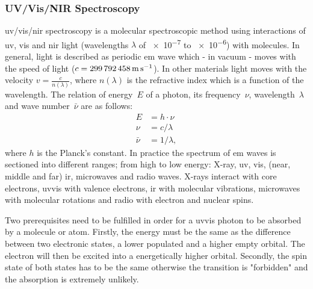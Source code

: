 \subsubsection{UV/Vis/NIR Spectroscopy}
\Gls{uv}/\gls{vis}/\gls{nir} spectroscopy is a molecular spectroscopic method using 
interactions of \gls{uv}, \gls{vis} and \gls{nir} light 
(wavelengths $\lambda$ of \num{e-7} to \num{e-6}\m{}) with molecules\cite{Schwedt2008}.
In general, light is described as periodic \gls{em} wave 
which - in vacuum - moves with the speed of light ($c = \SI{299792458}{\meter\per\second}$).
In other materials light moves with the velocity $v=\frac{c}{n(\lambda)}$, where $n(\lambda)$ is the refractive index which is a function of the wavelength. 
The relation of energy~$E$ of a photon, its frequency~$\nu$, wavelength~$\lambda$ and wave number~$\bar{\nu}$ are as follows:
\begin{align*}
	E &= h \cdot \nu \\
	\nu &= c/ \lambda \\
	\bar{\nu} &= 1/\lambda,
\end{align*}
where $h$ is the Planck's constant.
In practice the spectrum of \gls{em} waves is sectioned into different ranges; %
from high to low energy: X-ray, \gls{uv}, \gls{vis}, (near, middle and far) \gls{ir}, microwaves and radio waves. 
X-rays interact with core electrons, \gls{uv}\gls{vis} with valence electrons, \gls{ir} with molecular vibrations, microwaves with molecular rotations and radio with electron and nuclear spins. 

Two prerequisites need to be fulfilled in order for a \gls{uv}\gls{vis} photon to be 
absorbed by a molecule or atom.
Firstly, the energy must be the same as the difference between two electronic states, a lower populated and a higher empty orbital. 
The electron will then be excited into a energetically higher orbital.
Secondly, the spin state of both states has to be the same otherwise the transition is "forbidden" and the absorption is extremely unlikely. 

